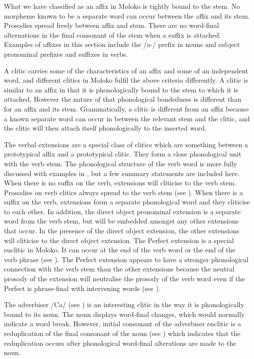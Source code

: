 What we have classified as an affix in Moloko is tightly bound to the stem. No morpheme known to be a separate word can occur between the affix and its stem. Prosodies spread freely between affix and stem. There are no word-final alternations in the final consonant of the stem when a suffix is attached. Examples of affixes in this section include the /a-/ prefix in nouns and subject pronominal prefixes and suffixes in verbs. 

A clitic carries some of the characteristics of an affix and some of an independent word, and different clitics in Moloko fulfil the above criteria differently. A clitic is similar to an affix in that it is phonologically bound to the stem to which it is attached. However the nature of that phonological bondedness is different than for an affix and its stem. Grammatically, a clitic is different from an affix because a known separate word can occur in between the relevant stem and the clitic, and the clitic will then attach itself phonologically to the inserted word.  

The verbal extensions are a special class of clitics which are something between a prototypical affix and a prototypical clitic. They form a close phonological unit with the verb stem. The phonological structure of the verb word is more fully discussed with examples in , but a few summary statements are included here. When there is no suffix on the verb, extensions will cliticise to the verb stem. Prosodies on verb clitics always spread to the verb stem (see ).  When there is a suffix on the verb, extensions form a \nohyphens{separate} phonological word and they cliticise to each other. In addition, the direct object pronominal extension is a separate word from the verb stem, but will be embedded amongst any other extensions that occur. In the presence of the direct object extension, the other extensions will cliticise to the direct object extension. The Perfect extension is a special enclitic in Moloko. It can occur at the end of the verb word or the end of the verb phrase (see ).  The Perfect extension appears to have a stronger phonological connection with the verb stem than the other extensions because the neutral prosody of the extension will neutralise the prosody of the verb word even if the Perfect is phrase-final with intervening words (see ).  

The adverbiser /Ca/ (see ) is an interesting clitic in the way it is phonologically bound to its noun. The noun displays word-final changes, which would normally indicate a word break. However, initial consonant of the adverbiser enclitic is a reduplication of the final consonant of the noun (see ) which indicates that the reduplication occurs after phonological word-final alterations are made to the noun. 

